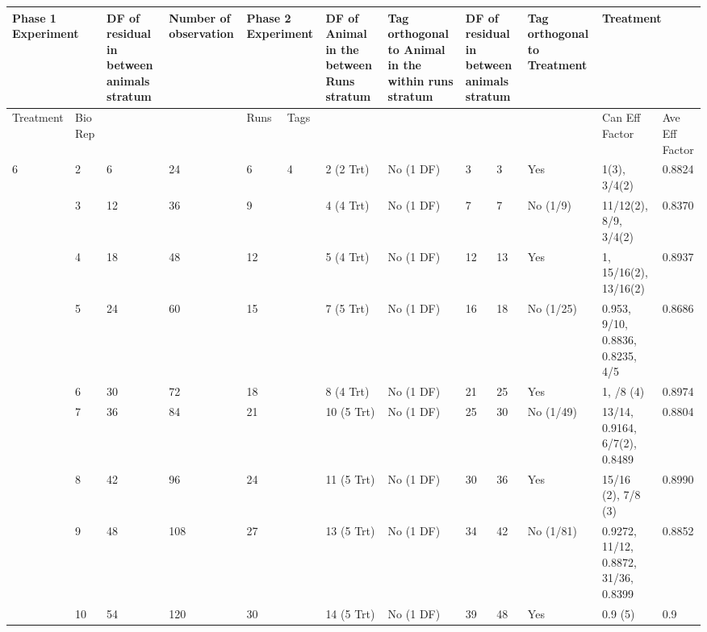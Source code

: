 \noindent \eject 

\begin{tabular}{|p{0.5in}|p{0.3in}|p{0.7in}|p{0.7in}|p{0.3in}|p{0.3in}|p{0.7in}|p{0.7in}|p{0.2in}|p{0.4in}|p{0.6in}|p{0.6in}|p{0.4in}|} \hline 
\multicolumn{2}{|p{1in}|}{Phase 1 Experiment} & DF of residual in between animals stratum & Number of observation  & \multicolumn{2}{|p{0.7in}|}{Phase 2 Experiment} & DF of Animal in the between Runs stratum  & Tag orthogonal to Animal in the within runs stratum & \multicolumn{2}{|p{0.6in}|}{DF of residual in between animals stratum} & Tag orthogonal to Treatment & \multicolumn{2}{|p{1.0in}|}{Treatment} \\ \hline 
Treatment & Bio Rep &  &  & Runs & Tags  &  &  & \multicolumn{2}{|p{0.6in}|}{} &  & Can Eff Factor & Ave Eff Factor \\ \hline 
6 & 2 & 6 & 24 & 6 & 4 & 2 (2 Trt) & No (1 DF) & 3 & 3 & Yes & 1(3), 3/4(2) & 0.8824 \\ \hline 
 & 3 & 12 & 36 & 9 &  & 4 (4 Trt) & No (1 DF) & 7 & 7 & No (1/9) & 11/12(2), 8/9, 3/4(2)  & 0.8370 \\ \hline 
 & 4 & 18 & 48 & 12 &  & 5 (4 Trt) & No (1 DF) & 12 & 13 & Yes & 1, 15/16(2), 13/16(2) & 0.8937 \\ \hline 
 & 5 & 24 & 60 & 15 &  & 7 (5 Trt) & No (1 DF) & 16 & 18 & No (1/25) & 0.953, 9/10, 0.8836, 0.8235, 4/5 & 0.8686 \\ \hline 
 & 6 & 30 & 72 & 18 &  & 8 (4 Trt) & No (1 DF) & 21 & 25 & Yes & 1,  \newline 7/8 (4)  & 0.8974 \\ \hline 
 & 7 & 36 & 84 & 21 &  & 10 (5 Trt) & No (1 DF) & 25 & 30 & No (1/49) & 13/14, 0.9164, 6/7(2),  0.8489 & 0.8804 \\ \hline 
 & 8 & 42 & 96 & 24 &  & 11 (5 Trt) & No (1 DF) & 30 & 36 & Yes & 15/16 (2),  7/8 (3)  & 0.8990 \\ \hline 
 & 9 & 48 & 108 & 27 &  & 13 (5 Trt) & No (1 DF) & 34 & 42 & No (1/81) & 0.9272, 11/12, 0.8872, 31/36, 0.8399 & 0.8852 \\ \hline 
 & 10 & 54 & 120 & 30 &  & 14 (5 Trt) & No (1 DF) & 39 & 48 & Yes & 0.9 (5) & 0.9 \\ \hline 
\end{tabular}



\noindent \eject 

